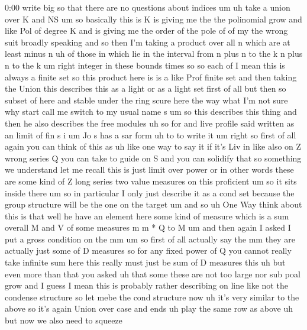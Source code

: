 \begin{unfinished}{0:00}
write  big  so  that  there  are  no  questions
about  indices  um
uh  take  a  union  over  K  and
NS
um  so  basically  this  is  K  is  giving  me
the  the  polinomial  grow  and
like  Pol  of  degree  K  and  is  giving  me
the  order  of  the  pole  of  of  my  the  wrong
suit  broadly  speaking  and  so  then  I'm
taking  a  product  over  all  n  which  are  at
least  minus
n  uh  of  those  in  which  lie  in  the
interval
from  n  plus  n  to  the  k  n  plus  n  to  the
k  um  right  integer  in  these
bounds
times  so  so  each  of  I  mean  this  is
always  a  finite  set  so  this  product  here
is  is  a  like  Prof  finite  set  and  then
taking  the  Union
this  describes  this  as  a  light  or  as  a
light  set  first  of  all  but
then  so  subset  of  here  and  stable  under
the  ring  scure
here
the  way
what  I'm  not  sure  why  start  call  me
switch  to  my  usual  name  s
um  so  this  describes  this  thing  and  then
he  also  describes  the  free
modules  uh  so
for  and  live  profile  said  written  as  an
limit  of  fin  s
i  um
Jo  s  has  a  sar
form  uh  to  to  write  it  um  right  so  first
of  all  again  you  can  think  of  this  as
uh  like  one  way  to  say  it  if  it's  Liv  in
like  also  on  Z  wrong  series  Q  you  can
take  to  guide  on  S  and  you  can  solidify
that  so  something  we  understand  let  me
recall  this  is
just  limit
over
power  or  in  other  words  these  are  some
kind  of  Z  long  series  two  value  measures
on
this
proficient
um  so  it  sits  inside  there  um  so  in
particular  I  only  just  describe  it  as
a  cond
set  because  the  group  structure  will  be
the  one  on  the  target
um  and  so
uh  One
Way  think  about  this  is
that  well  he  have  an  element  here  some
kind  of  measure  which  is  a  sum  overall  M
and  V  of  some  measures  m  m  *  Q  to
M  um  and  then  again  I  asked  I  put  a
gross  condition
on  the
mm  um  so  first  of  all  actually  say  the
mm  they  are  actually  just  some  of  D
measures  so  for  any  fixed  power  of  Q  you
cannot  really  take  infinite  sum  here
this  really  must  just  be  sum  of  D
measures
this  uh  but  even  more  than  that  you
asked  uh  that  some  these  are  not  too
large  nor
sub  poal
grow  and  I  guess  I  mean  this  is  probably
rather  describing  on  line  like  not  the
condense  structure  so  let  mebe  the  cond
structure
now  uh  it's  very  similar  to  the  above  so
it's  again  Union  over
case  and
ends  uh  play  the  same  row  as
above  uh  but  now  we  also  need  to  squeeze

\end{unfinished}
